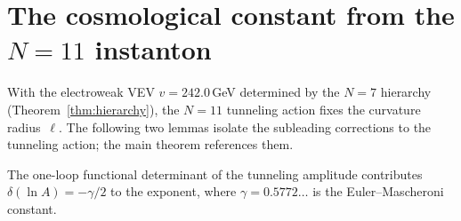 \section{The cosmological constant from the $N=11$ instanton}
\label{sec:cc-instanton}

With the electroweak VEV $v = 242.0$\,GeV determined by the
$N = 7$ hierarchy (Theorem~\ref{thm:hierarchy}), the $N = 11$
tunneling action fixes the curvature radius~$\ell$.
The following two lemmas isolate the subleading corrections
to the tunneling action; the main theorem references them.

\begin{lemma}
\label{lem:one-loop}
The one-loop functional determinant of the tunneling
amplitude contributes $\delta(\ln A) = -\gamma/2$
to the exponent, where $\gamma = 0.5772\ldots$ is the
Euler--Mascheroni constant.
\end{lemma}

